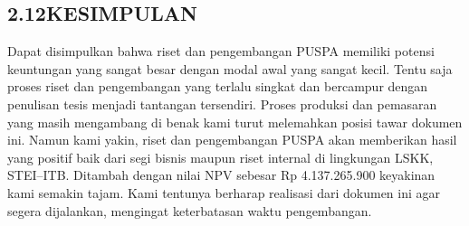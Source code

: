 \subsection*{\textsf{\normalsize 2.12\hspace{0.5cm}KESIMPULAN}}

Dapat disimpulkan bahwa riset dan pengembangan PUSPA memiliki potensi keuntungan yang sangat besar dengan modal awal yang sangat kecil. Tentu saja proses riset dan pengembangan yang terlalu singkat dan bercampur dengan penulisan tesis menjadi tantangan tersendiri. Proses produksi dan pemasaran yang masih mengambang di benak kami turut melemahkan posisi tawar dokumen ini. Namun kami yakin, riset dan pengembangan PUSPA akan memberikan hasil yang positif baik dari segi bisnis maupun riset internal di lingkungan LSKK, STEI--ITB. Ditambah dengan nilai NPV sebesar Rp 4.137.265.900 keyakinan kami semakin tajam. Kami tentunya berharap realisasi dari dokumen ini agar segera dijalankan, mengingat keterbatasan waktu pengembangan.
